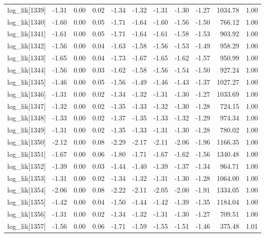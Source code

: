 \begin{table}[ht]
\begin{tabular}{rrrrrrrrrrr}
  log\_lik[1339] & -1.31 & 0.00 & 0.02 & -1.34 & -1.32 & -1.31 & -1.30 & -1.27 & 1034.78 & 1.00 \\ 
  log\_lik[1340] & -1.60 & 0.00 & 0.05 & -1.71 & -1.64 & -1.60 & -1.56 & -1.50 & 766.12 & 1.00 \\ 
  log\_lik[1341] & -1.61 & 0.00 & 0.05 & -1.71 & -1.64 & -1.61 & -1.58 & -1.53 & 903.92 & 1.00 \\ 
  log\_lik[1342] & -1.56 & 0.00 & 0.04 & -1.63 & -1.58 & -1.56 & -1.53 & -1.49 & 958.29 & 1.00 \\ 
  log\_lik[1343] & -1.65 & 0.00 & 0.04 & -1.73 & -1.67 & -1.65 & -1.62 & -1.57 & 950.99 & 1.00 \\ 
  log\_lik[1344] & -1.56 & 0.00 & 0.03 & -1.62 & -1.58 & -1.56 & -1.54 & -1.50 & 927.24 & 1.00 \\ 
  log\_lik[1345] & -1.46 & 0.00 & 0.05 & -1.56 & -1.49 & -1.46 & -1.43 & -1.37 & 1027.27 & 1.00 \\ 
  log\_lik[1346] & -1.31 & 0.00 & 0.02 & -1.34 & -1.32 & -1.31 & -1.30 & -1.27 & 1033.69 & 1.00 \\ 
  log\_lik[1347] & -1.32 & 0.00 & 0.02 & -1.35 & -1.33 & -1.32 & -1.30 & -1.28 & 724.15 & 1.00 \\ 
  log\_lik[1348] & -1.33 & 0.00 & 0.02 & -1.37 & -1.35 & -1.33 & -1.32 & -1.29 & 974.34 & 1.00 \\ 
  log\_lik[1349] & -1.31 & 0.00 & 0.02 & -1.35 & -1.33 & -1.31 & -1.30 & -1.28 & 780.02 & 1.00 \\ 
  log\_lik[1350] & -2.12 & 0.00 & 0.08 & -2.29 & -2.17 & -2.11 & -2.06 & -1.96 & 1166.35 & 1.00 \\ 
  log\_lik[1351] & -1.67 & 0.00 & 0.06 & -1.80 & -1.71 & -1.67 & -1.62 & -1.56 & 1340.48 & 1.00 \\ 
  log\_lik[1352] & -1.39 & 0.00 & 0.03 & -1.44 & -1.40 & -1.39 & -1.37 & -1.34 & 964.71 & 1.00 \\ 
  log\_lik[1353] & -1.31 & 0.00 & 0.02 & -1.34 & -1.32 & -1.31 & -1.30 & -1.28 & 1064.00 & 1.00 \\ 
  log\_lik[1354] & -2.06 & 0.00 & 0.08 & -2.22 & -2.11 & -2.05 & -2.00 & -1.91 & 1334.05 & 1.00 \\ 
  log\_lik[1355] & -1.42 & 0.00 & 0.04 & -1.50 & -1.44 & -1.42 & -1.39 & -1.35 & 1184.04 & 1.00 \\ 
  log\_lik[1356] & -1.31 & 0.00 & 0.02 & -1.34 & -1.32 & -1.31 & -1.30 & -1.27 & 709.51 & 1.00 \\ 
  log\_lik[1357] & -1.56 & 0.00 & 0.06 & -1.71 & -1.59 & -1.55 & -1.51 & -1.46 & 375.48 & 1.01 \\ 

\end{tabular}
\end{table}
